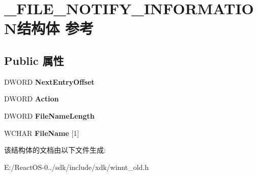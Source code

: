 \hypertarget{struct___f_i_l_e___n_o_t_i_f_y___i_n_f_o_r_m_a_t_i_o_n}{}\section{\+\_\+\+F\+I\+L\+E\+\_\+\+N\+O\+T\+I\+F\+Y\+\_\+\+I\+N\+F\+O\+R\+M\+A\+T\+I\+O\+N结构体 参考}
\label{struct___f_i_l_e___n_o_t_i_f_y___i_n_f_o_r_m_a_t_i_o_n}
\subsection*{Public 属性}
\begin{DoxyCompactItemize}
\item 
\mbox{\label{struct___f_i_l_e___n_o_t_i_f_y___i_n_f_o_r_m_a_t_i_o_n_af03d48010545b9b00a10709602426c37}} 
D\+W\+O\+RD {\bfseries Next\+Entry\+Offset}
\item 
\mbox{\label{struct___f_i_l_e___n_o_t_i_f_y___i_n_f_o_r_m_a_t_i_o_n_a3cb599353b4fb1f8413f531a31febb34}} 
D\+W\+O\+RD {\bfseries Action}
\item 
\mbox{\label{struct___f_i_l_e___n_o_t_i_f_y___i_n_f_o_r_m_a_t_i_o_n_a1e181e069f1b2763312943239b956ae0}} 
D\+W\+O\+RD {\bfseries File\+Name\+Length}
\item 
\mbox{\label{struct___f_i_l_e___n_o_t_i_f_y___i_n_f_o_r_m_a_t_i_o_n_a40f67063fb0e245bc42251ca8e761c83}} 
W\+C\+H\+AR {\bfseries File\+Name} \mbox{[}1\mbox{]}
\end{DoxyCompactItemize}


该结构体的文档由以下文件生成\+:\begin{DoxyCompactItemize}
\item 
E\+:/\+React\+O\+S-\/0../sdk/include/xdk/winnt\+\_\+old.\+h\end{DoxyCompactItemize}
